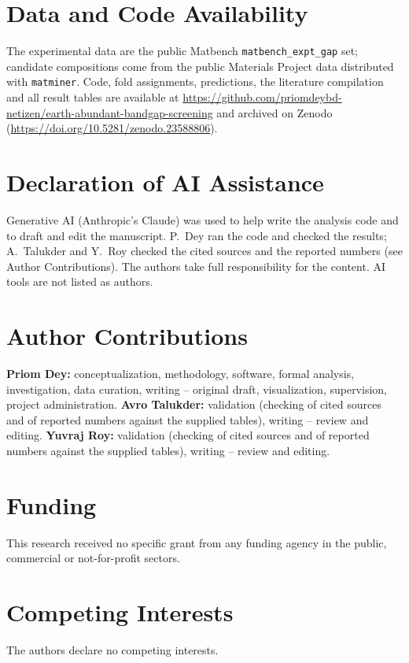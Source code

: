 \documentclass[11pt,a4paper]{article}
\begin{document}
\section*{Data and Code Availability}
The experimental data are the public Matbench \texttt{matbench\_expt\_gap} set; candidate compositions come from the public Materials Project data distributed with \texttt{matminer}. Code, fold assignments, predictions, the literature compilation and all result tables are available at \url{https://github.com/priomdeybd-netizen/earth-abundant-bandgap-screening} and archived on Zenodo (\url{https://doi.org/10.5281/zenodo.23588806}).

\section*{Declaration of AI Assistance}
Generative AI (Anthropic's Claude) was used to help write the analysis code and to draft and edit the manuscript. P.~Dey ran the code and checked the results; A.~Talukder and Y.~Roy checked the cited sources and the reported numbers (see Author Contributions). The authors take full responsibility for the content. AI tools are not listed as authors.

\section*{Author Contributions}
\textbf{Priom Dey:} conceptualization, methodology, software, formal analysis, investigation, data curation, writing -- original draft, visualization, supervision, project administration.
\textbf{Avro Talukder:} validation (checking of cited sources and of reported numbers against the supplied tables), writing -- review and editing.
\textbf{Yuvraj Roy:} validation (checking of cited sources and of reported numbers against the supplied tables), writing -- review and editing.

\section*{Funding}
This research received no specific grant from any funding agency in the public, commercial or not-for-profit sectors.

\section*{Competing Interests}
The authors declare no competing interests.

\appendix
\end{document}
